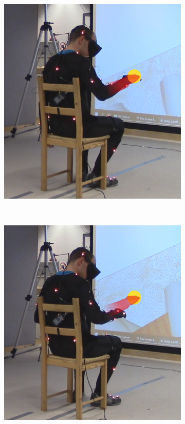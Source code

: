 \begin{figure}[h]
    \centering
    \begin{subfigure}[b]{.4\textwidth}
        \includegraphics[width=\textwidth]{Figures/handPositionTargetNoDist.png}
    \end{subfigure}
    ~
    \begin{subfigure}[b]{.4\textwidth}
        \includegraphics[width=\textwidth]{Figures/handPositionTarget.png}
    \end{subfigure}
        

\end{figure}
